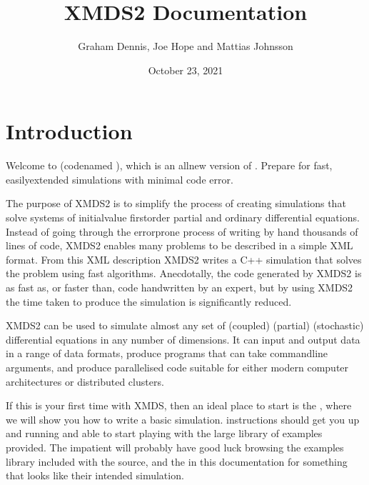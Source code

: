 \documentclass[letterpaper,10pt,english]{sphinxmanual}
\title{XMDS2 Documentation}
\date{October 23, 2021}
\author{Graham Dennis, Joe Hope and Mattias Johnsson}
\begin{document}
\pagestyle{empty}
\sphinxmaketitle
\pagestyle{plain}
\sphinxtableofcontents
\pagestyle{normal}
\label{\detokenize{documentation_toc::doc}}



\chapter{Introduction}
\label{\detokenize{introduction:introduction}}\label{\detokenize{introduction::doc}}
\sphinxAtStartPar
Welcome to  (codenamed ), which is an all\sphinxhyphen{}new version of {\hyperref[\detokenize{introduction:xmdshistory}]{}}.  Prepare for fast, easily\sphinxhyphen{}extended simulations with minimal code error.

\sphinxAtStartPar
{}   The purpose of XMDS2 is to simplify the process of creating simulations that solve systems of initial\sphinxhyphen{}value first\sphinxhyphen{}order partial and ordinary differential equations. Instead of going through the error\sphinxhyphen{}prone process of writing by hand thousands of lines of code, XMDS2 enables many problems to be described in a simple XML format. From this XML description XMDS2 writes a C++ simulation that solves the problem using fast algorithms. Anecdotally, the code generated by XMDS2 is as fast as, or faster than, code hand\sphinxhyphen{}written by an expert, but by using XMDS2 the time taken to produce the simulation is significantly reduced.

\sphinxAtStartPar
XMDS2 can be used to simulate almost any set of (coupled) (partial) (stochastic) differential equations in any number of dimensions.  It can input and output data in a range of data formats, produce programs that can take command\sphinxhyphen{}line arguments, and produce parallelised code suitable for either modern computer architectures or distributed clusters.

\sphinxAtStartPar
If this is your first time with XMDS, then an ideal place to start is the {\hyperref[\detokenize{tutorial:quickstarttutorial}]{}}, where we will show you how to write a basic simulation.  {\hyperref[\detokenize{installation:installation}]{}} instructions should get you up and running and able to start playing with the large library of examples provided. The impatient will probably have good luck browsing the examples library included with the source, and the {\hyperref[\detokenize{worked_examples:workedexamples}]{}} in this documentation for something that looks like their intended simulation.
\end{document}
